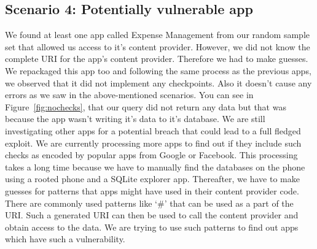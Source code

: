 \subsection{Scenario 4: Potentially vulnerable app} We found at least one app called Expense Management from our random sample set that allowed us access to it's content provider. However, we did not know the complete URI for the app's content provider. Therefore we had to make guesses. We repackaged this app too and following the same process as the previous apps, we observed that it did not implement any checkpoints. Also it doesn't cause any errors as we saw in the above-mentioned scenarios. You can see in Figure~\ref{fig:nochecks}, that our query did not return any data but that was because the app wasn't writing it's data to it's database. We are still investigating other apps for a potential breach that could lead to a full fledged exploit. We are currently processing more apps to find out if they include such checks as encoded by popular apps from Google or Facebook. This processing takes a long time because we have to manually find the databases on the phone using a rooted phone and a SQLite explorer app. Thereafter, we have to make guesses for patterns that apps might have used in their content provider code. There are commonly used patterns like `\#' that can be used as a part of the URI. Such a generated URI can then be used to call the content provider and obtain access to the data. We are trying to use such patterns to find out apps which have such a vulnerability.